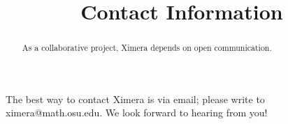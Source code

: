\documentclass{ximera}
\title{Contact Information}
\begin{document}
\begin{abstract}
  As a collaborative project, Ximera depends on open communication.
\end{abstract}
\maketitle

The best way to contact Ximera is via email; please write to
ximera@math.osu.edu. We look forward to hearing from you!
\end{document}
